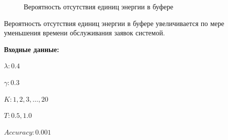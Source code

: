 \documentclass[12pt, a4paper]{article}
\begin{document}
\begin{figure}[h]
	\caption{Вероятность отсутствия единиц энергии в буфере}
	\label{ris5}
\end{figure}

Вероятность отсутствия единиц энергии в буфере увеличивается по мере уменьшения времени обслуживания заявок системой. 

\pagebreak
\textbf{Входные данные:}

$\lambda: 0.4$

$\gamma: 0.3$

$K: 1, 2, 3, \ldots, 20$

$T: 0.5, 1.0$

$Accuracy: 0.001$
\end{document}
